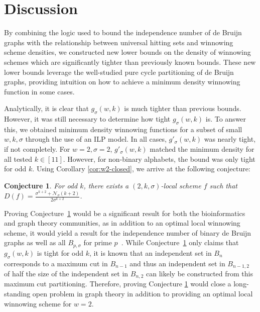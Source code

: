 \documentclass{article}
\newtheorem{conjecture}[theorem]{Conjecture}
\begin{document}
\section{Discussion}

By combining the logic used to bound the independence number of de Bruijn graphs with the relationship between universal hitting sets and winnowing scheme densities, we constructed new lower bounds on the density of winnowing schemes which are significantly tighter than previously known bounds. These new lower bounds leverage the well-studied pure cycle partitioning of de Bruijn graphs, providing intuition on how to achieve a minimum density winnowing function in some cases.

Analytically, it is clear that $g_\sigma(w,k)$ is much tighter than previous bounds. However, it was still necessary to determine how tight $g_\sigma(w,k)$ is. To answer this, we obtained minimum density winnowing functions for a subset of small $w, k, \sigma$ through the use of an ILP model. In all cases, $g'_\sigma(w,k)$ was nearly tight, if not completely. For $w=2, \sigma=2$, $g'_\sigma(w,k)$ matched the minimum density for all tested $k\in[11]$. However, for non-binary alphabets, the bound was only tight for odd $k$. Using Corollary \ref{cor:w2-closed}, we arrive at the following conjecture:

\begin{conjecture}
    \label{conj:w2}
For odd $k$, there exists a $(2, k, \sigma)$-local scheme $f$ such that \\$D(f) = \frac{\sigma^{k+2}+\mathcal{N_\sigma}(k+2)}{2\sigma^{k+2}}$.
    
\end{conjecture}

Proving Conjecture~\ref{conj:w2} would be a significant result for both the bioinformatics and graph theory communities, as in addition to an optimal local winnowing scheme, it would yield a result for the independence number of binary de Bruijn graphs as well as all $B_{p,\sigma}$ for prime $p$~\citep{lichiardopol2006independence}. While Conjecture~\ref{conj:w2} only claims that $g_\sigma(w, k)$ is tight for odd $k$, it is known that an independent set in $B_n$ corresponds to a maximum cut in $B_{n-1}$\citep{chvatal1990note} and thus an independent set in $B_{n-1,2}$ of half the size of the independent set in $B_{n, 2}$ can likely be constructed from this maximum cut partitioning.  Therefore, proving Conjecture \ref{conj:w2} would close a long-standing open problem in graph theory in addition to providing an optimal local winnowing scheme for $w=2$. 
\end{document}
